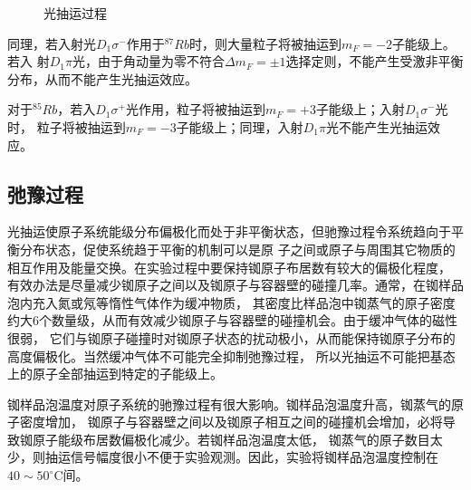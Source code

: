 \documentclass[11pt,a4paper]{article}
\begin{document}
\begin{spacing}{1.3}
\begin{CJK*}{UTF8}{gbsn}
\begin{figure}[!htbp]
\caption{光抽运过程}
\label{fig2-6-2}
\end{figure} 
\par
同理，若入射光$D_1\sigma^-$作用于$^{87}Rb$时，则大量粒子将被抽运到$m_F=-2$子能级上。若入
射$D_1\pi$光，由于角动量为零不符合$\Delta m_F = \pm 1$选择定则，不能产生受激非平衡分布，从而不能产生光抽运效应。\par
对于$^{85}Rb$，若入$D_1\sigma^+$光作用，粒子将被抽运到$m_F=+3$子能级上；入射$D_1\sigma^-$光时，
粒子将被抽运到$m_F=-3$子能级上；同理，入射$D_1\pi$光不能产生光抽运效应。

\subsection{弛豫过程}
光抽运使原子系统能级分布偏极化而处于非平衡状态，但驰豫过程令系统趋向于平衡分布状态，促使系统趋于平衡的机制可以是原
子之间或原子与周围其它物质的相互作用及能量交换。在实验过程中要保持铷原子布居数有较大的偏极化程度，
有效办法是尽量减少铷原子之间以及铷原子与容器壁的碰撞几率。通常，在铷样品泡内充入氮或氖等惰性气体作为缓冲物质，
其密度比样品泡中铷蒸气的原子密度约大6个数量级，从而有效减少铷原子与容器壁的碰撞机会。由于缓冲气体的磁性很弱，
它们与铷原子碰撞时对铷原子状态的扰动极小，从而能保持铷原子分布的高度偏极化。当然缓冲气体不可能完全抑制弛豫过程，
所以光抽运不可能把基态上的原子全部抽运到特定的子能级上。\par
铷样品泡温度对原子系统的驰豫过程有很大影响。铷样品泡温度升高，铷蒸气的原子密度增加，
铷原子与容器壁之间以及铷原子相互之间的碰撞机会增加，必将导致铷原子能级布居数偏极化减少。若铷样品泡温度太低，
铷蒸气的原子数目太少，则抽运信号幅度很小不便于实验观测。因此，实验将铷样品泡温度控制在$40\sim 50^{\circ}$C间。\par


\end{CJK*}
\end{spacing}
\end{document}
